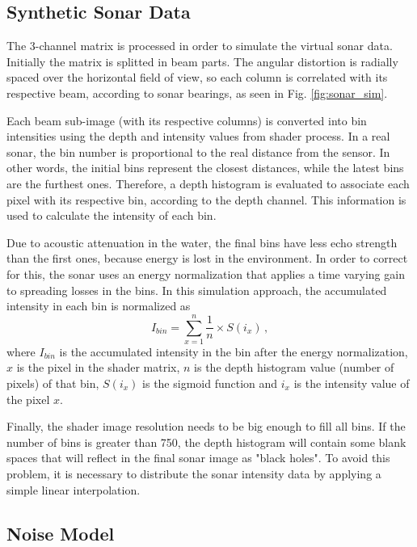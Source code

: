 \documentclass[final,5p,times]{elsarticle}
\begin{document}
\subsection{Synthetic Sonar Data}
\label{dev:sonardata}

The 3-channel matrix is processed in order to simulate the virtual sonar data. Initially the matrix is splitted in beam parts. The angular distortion is radially spaced over the horizontal field of view, so each column is correlated with its respective beam, according to sonar bearings, as seen in Fig. \ref{fig:sonar_sim}.

Each beam sub-image (with its respective columns) is converted into bin intensities using the depth and intensity values from shader process. In a real sonar, the bin number is proportional to the real distance from the sensor. In other words, the initial bins represent the closest distances, while the latest bins are the furthest ones. Therefore, a depth histogram is evaluated to associate each pixel with its respective bin, according to the depth channel. This information is used to calculate the intensity of each bin.

Due to acoustic attenuation in the water, the final bins have less echo strength than the first ones, because energy is lost in the environment. In order to correct for this, the sonar uses an energy normalization that applies a time varying gain to spreading losses in the bins. In this simulation approach, the accumulated intensity in each bin is normalized as
\begin{equation}
    \label{eq:1}
    I_{bin} = \sum\limits_{x=1}^n \frac{1}{n} \times S(i_{x}) \, ,
\end{equation}
where $I_{bin}$ is the accumulated intensity in the bin after the energy normalization, $x$ is the pixel in the shader matrix, $n$ is the depth histogram value (number of pixels) of that bin, $S(i_{x})$ is the sigmoid function and $i_{x}$ is the intensity value of the pixel $x$.

Finally, the shader image resolution needs to be big enough to fill all bins. If the number of bins is greater than 750, the depth histogram will contain some blank spaces that will reflect in the final sonar image as "black holes". To avoid this problem, it is necessary to distribute the sonar intensity data by applying a simple linear interpolation.

\subsection{Noise Model}
\label{dev:noise}
\end{document}

